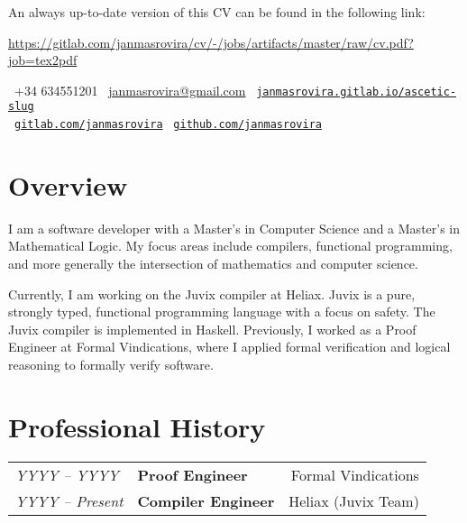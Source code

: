 \documentclass[11pt]{article}
\begin{document}
\par{\bigskip\par}
\titleformat{\section}{\Large\scshape\raggedright}{}{0em}{}[\titlerule]

An always up-to-date version of this CV can be found in the following link:
\begin{center}
\url{https://gitlab.com/janmasrovira/cv/-/jobs/artifacts/master/raw/cv.pdf?job=tex2pdf}
\end{center}

\vspace{0.4cm}

\begin{center}
    \hfill
    \faPhone\ +34 634551201
    \hfill
    \faEnvelope\ \href{mailto:janmasrovira@gmail.com}{janmasrovira@gmail.com}
    \hfill
    \faGlobe\ \href{https://janmasrovira.gitlab.io/ascetic-slug/}{\texttt{janmasrovira.gitlab.io/ascetic-slug}}
    \hspace*{\fill}
    \\
    \vspace{0.1cm}
    \hfill
    \faGitlab\ \href{https://gitlab.com/janmasrovira}{\texttt{gitlab.com/janmasrovira}}
    \hfill
    \faGithub\ \href{https://github.com/janmasrovira}{\texttt{github.com/janmasrovira}}
    \hspace*{\fill}
\end{center}

\section{Overview}

I am a software developer with a Master's in Computer Science and a Master's in
Mathematical Logic. My focus areas include compilers, functional programming,
and more generally the intersection of mathematics and computer science.

Currently, I am working on the Juvix compiler at Heliax. Juvix is a pure,
strongly typed, functional programming language with a focus on safety. The Juvix compiler is implemented in Haskell.
Previously, I worked as a Proof Engineer at Formal Vindications, where I applied
formal verification and logical reasoning to formally verify software.

\section{Professional History}
\begin{tabular}{@{}p{3cm} p{6cm} r@{}}
    \textit{YYYY – YYYY} & \textbf{Proof Engineer} & Formal Vindications \\
    \textit{YYYY – Present} & \textbf{Compiler Engineer} & Heliax (Juvix Team) \\
\end{tabular}
\end{document}
